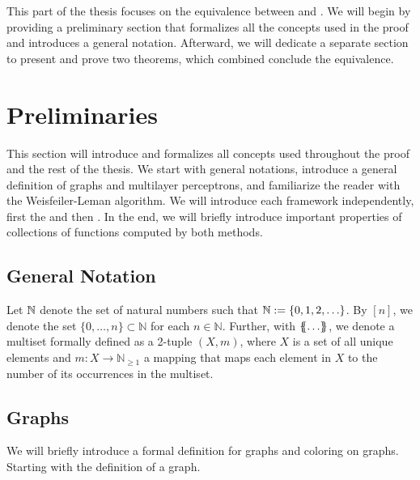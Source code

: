 \cleardoubleoddstandardpage

This part of the thesis focuses on the equivalence between \wlnn and \gnn. We will begin by providing a preliminary section that formalizes all the concepts used in the proof and introduces a general notation. Afterward, we will dedicate a separate section to present and prove two theorems, which combined conclude the equivalence.

{\let\clearpage\relax
\chapter{Preliminaries}\label{sec:pre_lim}
This section will introduce and formalizes all concepts used throughout the proof and the rest of the thesis. We start with general notations, introduce a general definition of graphs and multilayer perceptrons, and familiarize the reader with the Weisfeiler-Leman algorithm. We will introduce each framework independently, first the \wlnn and then \gnn. In the end, we will briefly introduce important properties of collections of functions computed by both methods.}

\section{General Notation}
Let $\mathbb{N}$ denote the set of natural numbers such that $\mathbb{N} := \{0, 1,2, \ldots \}$. By $[n]$, we denote the set $\{0, \ldots, n\} \subset \mathbb{N}$ for each $n \in \mathbb{N}$. Further, with $\{\!\!\{ \ldots \}\!\!\}$, we denote a multiset formally defined as a 2-tuple $(X, m)$, where $X$ is a set of all unique elements and $m: X \rightarrow \mathbb{N}_{\geq 1}$ a mapping that maps each element in $X$ to the number of its occurrences in the multiset.

\section{Graphs}
We will briefly introduce a formal definition for graphs and coloring on graphs. Starting with the definition of a graph.

